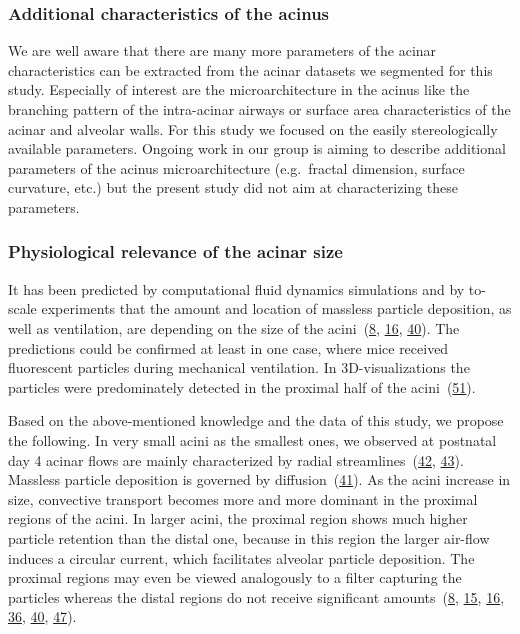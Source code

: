 \documentclass[
  american,
]{article}
\begin{document}
\hypertarget{additional-characteristics-of-the-acinus}{%
\subsubsection{Additional characteristics of the acinus}\label{additional-characteristics-of-the-acinus}}

We are well aware that there are many more parameters of the acinar characteristics can be extracted from the acinar datasets we segmented for this study.
Especially of interest are the microarchitecture in the acinus like the branching pattern of the intra-acinar airways or surface area characteristics of the acinar and alveolar walls.
For this study we focused on the easily stereologically available parameters.
Ongoing work in our group is aiming to describe additional parameters of the acinus microarchitecture (e.g.~fractal dimension, surface curvature, etc.) but the present study did not aim at characterizing these parameters.

\hypertarget{physiological-relevance-of-the-acinar-size}{%
\subsubsection{Physiological relevance of the acinar size}\label{physiological-relevance-of-the-acinar-size}}

It has been predicted by computational fluid dynamics simulations and by to-scale experiments that the amount and location of massless particle deposition, as well as ventilation, are depending on the size of the acini~(\protect\hyperlink{ref-CVl41LwO}{8}, \protect\hyperlink{ref-1DP2FRUSZ}{16}, \protect\hyperlink{ref-RJ9GQcwl}{40}).
The predictions could be confirmed at least in one case, where mice received fluorescent particles during mechanical ventilation.
In 3D-visualizations the particles were predominately detected in the proximal half of the acini~(\protect\hyperlink{ref-19jBv0ima}{51}).

Based on the above-mentioned knowledge and the data of this study, we propose the following.
In very small acini as the smallest ones, we observed at postnatal day 4 acinar flows are mainly characterized by radial streamlines~(\protect\hyperlink{ref-afF83siN}{42}, \protect\hyperlink{ref-eioib1TQ}{43}).
Massless particle deposition is governed by diffusion~(\protect\hyperlink{ref-k5fqLjiy}{41}).
As the acini increase in size, convective transport becomes more and more dominant in the proximal regions of the acini.
In larger acini, the proximal region shows much higher particle retention than the distal one, because in this region the larger air-flow induces a circular current, which facilitates alveolar particle deposition.
The proximal regions may even be viewed analogously to a filter capturing the particles whereas the distal regions do not receive significant amounts~(\protect\hyperlink{ref-CVl41LwO}{8}, \protect\hyperlink{ref-1HOyVjqpM}{15}, \protect\hyperlink{ref-1DP2FRUSZ}{16}, \protect\hyperlink{ref-yHHhvOtP}{36}, \protect\hyperlink{ref-RJ9GQcwl}{40}, \protect\hyperlink{ref-OT4s1CSX}{47}).
\end{document}
